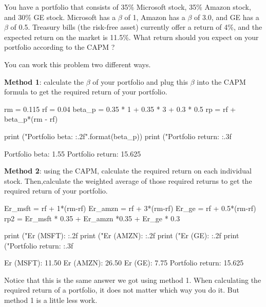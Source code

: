 \begin{question}
You have a portfolio that consists of 35\% Microsoft stock, 35\% Amazon stock, and 30\% GE stock. Microsoft has a $\beta$ of 1, Amazon has a $\beta$ of 3.0, and GE has a $\beta$ of 0.5. Treasury bills (the risk-free asset) currently offer a return of 4\%, and the expected return on the market is 11.5\%. What return should you expect on your portfolio according to the CAPM ? 
\end{question}

\cprotEnv \begin{solution}
You can work this problem two different ways.

\textbf{Method 1}: calculate the $\beta$ of your portfolio and plug this $\beta$ into the CAPM formula to get the required return of your portfolio.

\begin{ipython}
rm = 0.115
rf = 0.04
beta_p = 0.35 * 1 + 0.35 * 3 + 0.3 * 0.5
rp = rf + beta_p*(rm - rf)

print ("Portfolio beta: {:.2f}".format(beta_p))
print ("Portfolio return: {:.3f}%
\end{ipython}
\begin{ioutput}
Portfolio beta: 1.55
Portfolio return: 15.625%
\end{ioutput}

\textbf{Method 2}: using the CAPM, calculate the required return on each individual stock. Then,calculate the weighted average of those required returns to get the required return of your portfolio.

\begin{ipython}
Er_msft = rf + 1*(rm-rf)
Er_amzn = rf + 3*(rm-rf)
Er_ge = rf + 0.5*(rm-rf)
rp2 = Er_msft * 0.35 + Er_amzn *0.35 + Er_ge * 0.3

print ("Er (MSFT): {:.2f}%
print ("Er (AMZN): {:.2f}%
print ("Er (GE): {:.2f}%
print ("Portfolio return: {:.3f}%
\end{ipython}
\begin{ioutput}
Er (MSFT): 11.50%
Er (AMZN): 26.50%
Er (GE): 7.75%
Portfolio return: 15.625%
\end{ioutput}
Notice that this is the same answer we got using method 1. When calculating the required return of a portfolio, it does not matter which way you do it. But method 1 is a little less work.
\end{solution}
